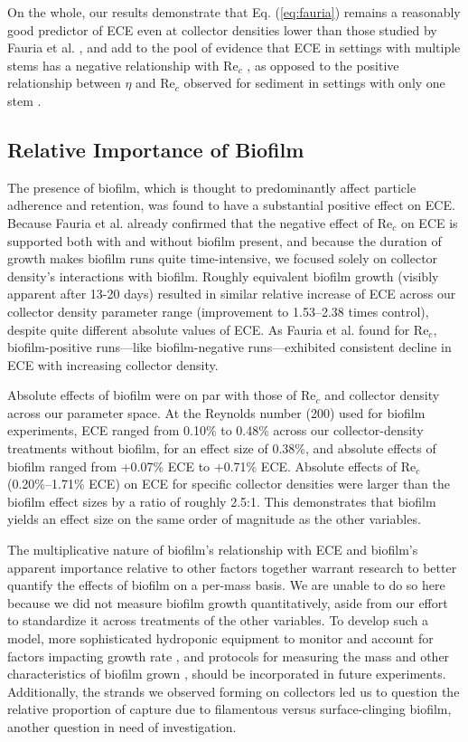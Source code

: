 \documentclass[geosciences,article,submit,moreauthors,pdftex]{Definitions/mdpi}
\newcommand\Rey{\mathrm{Re}}
\begin{document}
On the whole, our results demonstrate that Eq. (\ref{eq:fauria}) remains a reasonably good predictor of ECE even at collector densities lower than those studied by Fauria et al. \cite{Fauria_2015}, and add to the pool of evidence that ECE in settings with multiple stems has a negative relationship with $\Rey_c$ \cite{Fauria_2015,purich2006capture,wu2014colloid}, as opposed to the positive relationship between $\eta$ and $\Rey_c$ observed for sediment in settings with only one stem \cite{Palmer_2004}.

\subsection{Relative Importance of Biofilm}

The presence of biofilm, which is thought to predominantly affect particle adherence and retention, was found to have a substantial positive effect on ECE. Because Fauria et al. \cite{Fauria_2015} already confirmed that the negative effect of $\Rey_c$ on ECE is supported both with and without biofilm present, and because the duration of growth makes biofilm runs quite time-intensive, we focused solely on collector density's interactions with biofilm. Roughly equivalent biofilm growth (visibly apparent after 13-20 days) resulted in similar relative increase of ECE across our collector density parameter range (improvement to 1.53--2.38 times control), despite quite different absolute values of ECE. As Fauria et al. \cite{Fauria_2015} found for $\Rey_c$, biofilm-positive runs---like biofilm-negative runs---exhibited consistent decline in ECE with increasing collector density.

Absolute effects of biofilm were on par with those of $\Rey_c$ and collector density across our parameter space. At the Reynolds number (200) used for biofilm experiments, ECE ranged from 0.10\% to 0.48\% across our collector-density treatments without biofilm, for an effect size of 0.38\%, and absolute effects of biofilm ranged from +0.07\% ECE to +0.71\% ECE. Absolute effects of $\Rey_c$ (0.20\%--1.71\% ECE) on ECE for specific collector densities were larger than the biofilm effect sizes by a ratio of roughly 2.5:1. This demonstrates that biofilm yields an effect size on the same order of magnitude as the other variables.

The multiplicative nature of biofilm's relationship with ECE and biofilm's apparent importance relative to other factors together warrant research to better quantify the effects of biofilm on a per-mass basis. We are unable to do so here because we did not measure biofilm growth quantitatively, aside from our effort to standardize it across treatments of the other variables. To develop such a model, more sophisticated hydroponic equipment to monitor and account for factors impacting growth rate \cite{schnurr2014effect, trulear1982dynamics}, and protocols for measuring the mass and other characteristics of biofilm grown \cite{liu1994simple,characklis1982dynamics}, should be incorporated in future experiments. Additionally, the strands we observed forming on collectors led us to question the relative proportion of capture due to filamentous versus surface-clinging biofilm, another question in need of investigation.
\end{document}
